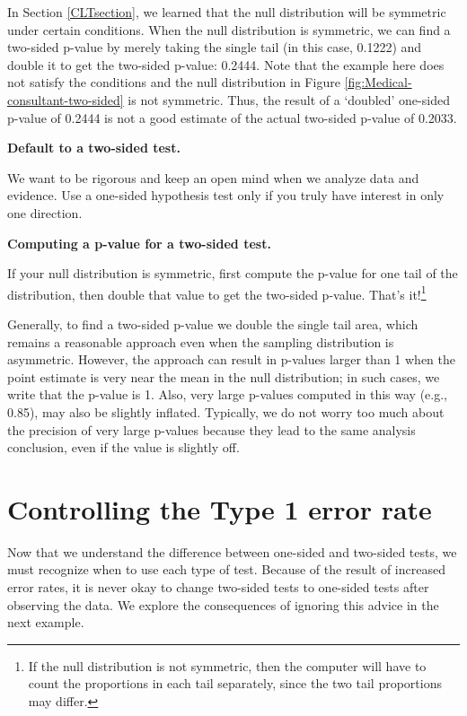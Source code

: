 \documentclass[
  10pt,
  openany]{book}
\theoremstyle{definition}
\theoremstyle{definition}
\theoremstyle{definition}
\theoremstyle{definition}
\theoremstyle{remark}
\begin{document}
In Section \ref{CLTsection}, we learned that the null distribution will be symmetric under certain conditions. When the null distribution is symmetric, we can find a two-sided p-value by merely taking the single tail (in this case, 0.1222) and double it to get the two-sided p-value: 0.2444. Note that the example here does not satisfy the conditions and the null distribution in Figure \ref{fig:Medical-consultant-two-sided} is not symmetric. Thus, the result of a `doubled' one-sided p-value of 0.2444 is not a good estimate of the actual two-sided p-value of 0.2033.


\textbf{Default to a two-sided test.}

We want to be rigorous and keep an open mind when we analyze data and evidence. Use a one-sided hypothesis test only if you truly have interest in only one direction.

\textbf{Computing a p-value for a two-sided test.}

If your null distribution is symmetric, first compute the p-value for one tail of the distribution, then double that value to get the two-sided p-value. That's it!\footnote{If the null distribution is not symmetric, then the computer will have to count the proportions in each tail separately, since the two tail proportions may differ.}

Generally, to find a two-sided p-value we double the single tail area, which remains a reasonable approach even when the sampling distribution is asymmetric. However, the approach can result in p-values larger than 1 when the point estimate is very near the mean in the null distribution; in such cases, we write that the p-value is 1. Also, very large p-values computed in this way (e.g., 0.85), may also be slightly inflated. Typically, we do not worry too much about the precision of very large p-values because they lead to the same analysis conclusion, even if the value is slightly off.

\section{Controlling the Type 1 error rate}\label{controlling-the-type-1-error-rate}

Now that we understand the difference between one-sided and two-sided tests, we must recognize when to use each type of test.
Because of the result of increased error rates, it is never okay to change two-sided tests to one-sided tests after observing the data.
We explore the consequences of ignoring this advice in the next example.
\end{document}
